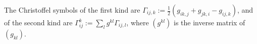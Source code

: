 The Christoffel symbols of the first kind are $\Gamma_{ij,k} := \frac{1}{2}(g_{ik,j} + g_{jk,i} - g_{ij,k})$, and of the second kind are $\Gamma_{ij}^k := \sum_l g^{kl} \Gamma_{ij,l}$, where $(g^{kl})$ is the inverse matrix of $(g_{kl})$.